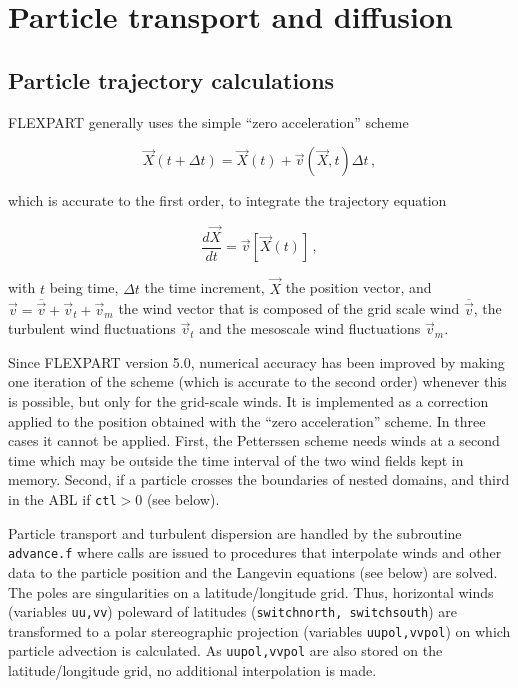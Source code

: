 \documentclass{egu}                  %
\begin{document}
\section{\label{diffusion}Particle transport and diffusion}

\subsection{Particle trajectory calculations}

FLEXPART generally uses the simple ``zero acceleration'' scheme 

\begin{equation}
{\vec{X}}(t+\Delta t)={\vec{X}}(t)+{\vec{v}}({\vec{X}},t) \Delta t\,,
\label{firstorder}
\end{equation}

which is accurate to the first order, to integrate the trajectory equation \citep{stohl1998}

\begin{equation}
\frac{d {\vec{X}}}{dt}={\vec{v}}[{\vec{X}}(t)] \,,
\end{equation}

with $t$ being time, $\Delta t$ the time increment, ${\vec{X}}$ the position
vector, and ${\vec{v}}=\overline{\vec{v}}+{\vec{v}}_t+{\vec{v}}_m$ the wind
vector that is composed of the grid scale wind $\overline{\vec{v}}$, the
turbulent wind fluctuations ${\vec{v}}_t$ and the mesoscale wind fluctuations
${\vec{v}}_m$.

Since FLEXPART version 5.0, numerical accuracy has been improved by making one
iteration of the \citet{petterssen1940} scheme (which is accurate to the second
order) whenever this is possible, but only for the grid-scale winds.  It is
implemented as a correction applied to the position obtained with the ``zero
acceleration'' scheme.  In three cases it cannot be applied.  First, the
Petterssen scheme needs winds at a second time which may be outside the time
interval of the two wind fields kept in memory.  Second, if a particle crosses
the boundaries of nested domains, and third in the ABL if \verb|ctl|$>0$ (see
below).

Particle transport and turbulent dispersion are handled by the subroutine
\verb|advance.f| where calls are issued to procedures that interpolate winds
and other data to the particle position and the Langevin equations (see below)
are solved.  The poles are singularities on a latitude/longitude grid.  Thus,
horizontal winds (variables \verb|uu,vv|) poleward of latitudes
(\verb|switchnorth, switchsouth|) are transformed to a polar stereographic
projection (variables \verb|uupol,vvpol|) on which particle advection is
calculated.  As \verb|uupol,vvpol| are also stored on the latitude/longitude
grid, no additional interpolation is made.
\end{document}
